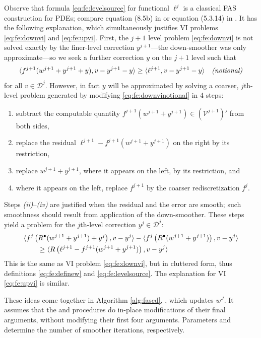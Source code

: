 \documentclass[letterpaper,final,12pt,reqno]{amsart}
\theoremstyle{cstyle}
\theoremstyle{cstyle*}
\theoremstyle{dstyle}
\numberwithin{equation}{section}
\numberwithin{figure}{section}
\numberwithin{table}{section}
\numberwithin{theorem}{section}
\newcommand{\ip}[2]{\langle#1,#2\rangle}
\newcommand{\iR}{R^{\bullet}}
\begin{document}
Observe that formula \eqref{eq:fe:levelsource} for functional $\ell^j$ is a classical FAS construction for PDEs; compare equation (8.5b) in \cite{BrandtLivne2011} or equation (5.3.14) in \cite{Trottenbergetal2001}.  It has the following explanation, which simultaneously justifies VI problems \eqref{eq:fe:downvi} and \eqref{eq:fe:upvi}.  First, the $j+1$ level problem \eqref{eq:fe:downvi} is not solved exactly by the finer-level correction $y^{j+1}$---the down-smoother was only approximate---so we seek a further correction $y$ on the $j+1$ level such that
\begin{equation}
\ip{f^{j+1}(w^{j+1}+y^{j+1}+y)}{v-y^{j+1}-y} \ge \ip{\ell^{j+1}}{v-y^{j+1}-y} \quad \text{\emph{(notional)}} \label{eq:fe:downvinotional}
\end{equation}
for all $v\in \mathcal{D}^j$.  However, in fact $y$ will be approximated by solving a coarser, $j$th-level problem generated by modifying \eqref{eq:fe:downvinotional} in 4 steps:
\begin{enumerate}
\item subtract the computable quantity $f^{j+1}(w^{j+1}+y^{j+1}) \in (\mathcal{V}^{j+1})'$ from both sides,
\item replace the residual $\ell^{j+1}-f^{j+1}(w^{j+1}+y^{j+1})$ on the right by its restriction,
\item replace $w^{j+1}+y^{j+1}$, where it appears on the left, by its restriction, and
\item where it appears on the left, replace $f^{j+1}$ by the coarser rediscretization $f^j$.
\end{enumerate}
Steps \emph{(ii)}--\emph{(iv)} are justified when the residual and the error are smooth; such smoothness should result from application of the down-smoother.  These steps yield a problem for the $j$th-level correction $y^j \in \mathcal{D}^j$:
\begin{align}
&\ip{f^j\left(\iR(w^{j+1}+y^{j+1})+y^j\right)}{v-y^j} - \ip{f^j\left(\iR(w^{j+1}+y^{j+1})\right)}{v-y^j} \label{eq:fe:downvicluttered} \\
&\qquad \ge \ip{R\left(\ell^{j+1}-f^{j+1}(w^{j+1}+y^{j+1})\right)}{v-y^j} \notag
\end{align}
This is the same as VI problem \eqref{eq:fe:downvi}, but in cluttered form, thus definitions \eqref{eq:fe:definew} and \eqref{eq:fe:levelsource}.  The explanation for VI \eqref{eq:fe:upvi} is similar.

These ideas come together in Algorithm \ref{alg:fascd}, , which updates $w^J$.  It assumes that the  and  procedures do in-place modifications of their final arguments, without modifying their first four arguments.  Parameters  and  determine the number of smoother iterations, respectively.
\end{document}

